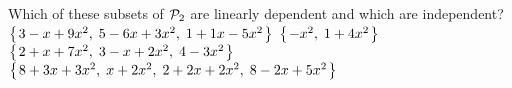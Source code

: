 
\begin{Exercise}[
name={},
title={}, 
difficulty=0,
origin={\cite{JH}}]
Which of these subsets of \( \mathcal{P}_2 \) are
    linearly dependent and which are independent?
\Question \( \mbox{$\left\{\hspace{0.1em}3-x+9x^2,\;5-6x+3x^2,\;1+1x-5x^2\hspace{0.1em}\right\}$} \)
\Question \( \mbox{$\left\{\hspace{0.1em}-x^2,\;1+4x^2\hspace{0.1em}\right\}$} \)
\Question \( \mbox{$\left\{\hspace{0.1em}2+x+7x^2,\;3-x+2x^2,\;4-3x^2\hspace{0.1em}\right\}$} \)
\Question \( \mbox{$\left\{\hspace{0.1em}8+3x+3x^2,\;x+2x^2,\;2+2x+2x^2,\;8-2x+5x^2\hspace{0.1em}\right\}$} \)
\end{Exercise}

